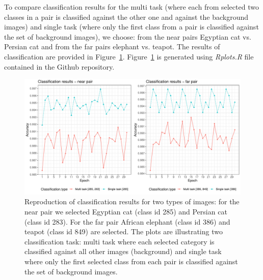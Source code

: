 \documentclass{article} %
\begin{document}
To compare classification results for the multi task (where each from selected two classes in a pair is classified against the other one and against the background images) and single task (where only the first class from a pair is classified against the set of background images), we choose: from the near pairs Egyptian cat vs. Persian cat and from the far pairs elephant vs. teapot. The results of classification are provided in Figure~\ref{Fig:ClassResults}. Figure~\ref{Fig:ClassResults} is generated using \textit{Rplots.R} file contained in the Github repository.

\begin{figure}[h!t]
	\centering 
	\includegraphics[width=1.0\linewidth]{ClassificationResults.pdf}
	\caption{Reproduction of classification results for two types of images: for the near pair we selected Egyptian cat (class id 285) and Persian cat (class id 283). For the far pair African elephant (class id 386) and teapot (class id 849) are selected. The plots are illustrating two classification task: multi task where each selected category is classified against all other images (background) and single task where only the first selected class from each pair is classified against the set of background images.}
	\label{Fig:ClassResults} 
\end{figure}




\end{document}
